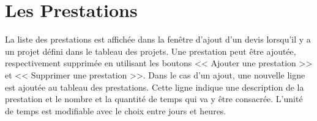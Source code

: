 \section{Les Prestations}
La liste des prestations est affichée dans la fenêtre d'ajout d'un devis lorsqu'il y a un projet défini dans le tableau des projets. Une prestation peut être ajoutée, respectivement supprimée en utilisant les boutons << Ajouter une prestation >> et << Supprimer une prestation >>. Dans le cas d'un ajout, une nouvelle ligne est ajoutée au tableau des prestations. Cette ligne indique une description de la prestation et le nombre et la quantité de temps qui va y être consacrée. L'unité de temps est modifiable avec le choix entre jours et heures.